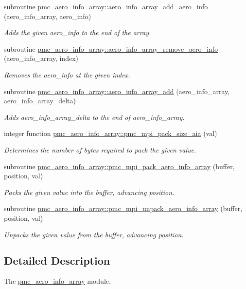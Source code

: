 \begin{DoxyCompactItemize}
subroutine \mbox{\hyperlink{namespacepmc__aero__info__array_a6a9a944a44aa3d2baf2442c9d90648b3}{pmc\+\_\+aero\+\_\+info\+\_\+array\+::aero\+\_\+info\+\_\+array\+\_\+add\+\_\+aero\+\_\+info}} (aero\+\_\+info\+\_\+array, aero\+\_\+info)
\begin{DoxyCompactList}\small\item\em Adds the given aero\+\_\+info to the end of the array. \end{DoxyCompactList}\item 
subroutine \mbox{\hyperlink{namespacepmc__aero__info__array_a60ce5d65642024604428bd7a6764ac70}{pmc\+\_\+aero\+\_\+info\+\_\+array\+::aero\+\_\+info\+\_\+array\+\_\+remove\+\_\+aero\+\_\+info}} (aero\+\_\+info\+\_\+array, index)
\begin{DoxyCompactList}\small\item\em Removes the aero\+\_\+info at the given index. \end{DoxyCompactList}\item 
subroutine \mbox{\hyperlink{namespacepmc__aero__info__array_a40802e262efd0945b1bf37cf548b4bb3}{pmc\+\_\+aero\+\_\+info\+\_\+array\+::aero\+\_\+info\+\_\+array\+\_\+add}} (aero\+\_\+info\+\_\+array, aero\+\_\+info\+\_\+array\+\_\+delta)
\begin{DoxyCompactList}\small\item\em Adds {\ttfamily aero\+\_\+info\+\_\+array\+\_\+delta} to the end of {\ttfamily aero\+\_\+info\+\_\+array}. \end{DoxyCompactList}\item 
integer function \mbox{\hyperlink{namespacepmc__aero__info__array_a80e0fdcb7ccd8fde3594259863523ed9}{pmc\+\_\+aero\+\_\+info\+\_\+array\+::pmc\+\_\+mpi\+\_\+pack\+\_\+size\+\_\+aia}} (val)
\begin{DoxyCompactList}\small\item\em Determines the number of bytes required to pack the given value. \end{DoxyCompactList}\item 
subroutine \mbox{\hyperlink{namespacepmc__aero__info__array_a7991a20a1777310cb3eff21efc188a99}{pmc\+\_\+aero\+\_\+info\+\_\+array\+::pmc\+\_\+mpi\+\_\+pack\+\_\+aero\+\_\+info\+\_\+array}} (buffer, position, val)
\begin{DoxyCompactList}\small\item\em Packs the given value into the buffer, advancing position. \end{DoxyCompactList}\item 
subroutine \mbox{\hyperlink{namespacepmc__aero__info__array_a1439690489e5c170ecc3b85db4f6cbd4}{pmc\+\_\+aero\+\_\+info\+\_\+array\+::pmc\+\_\+mpi\+\_\+unpack\+\_\+aero\+\_\+info\+\_\+array}} (buffer, position, val)
\begin{DoxyCompactList}\small\item\em Unpacks the given value from the buffer, advancing position. \end{DoxyCompactList}\end{DoxyCompactItemize}


\subsection{Detailed Description}
The \mbox{\hyperlink{namespacepmc__aero__info__array}{pmc\+\_\+aero\+\_\+info\+\_\+array}} module. 

